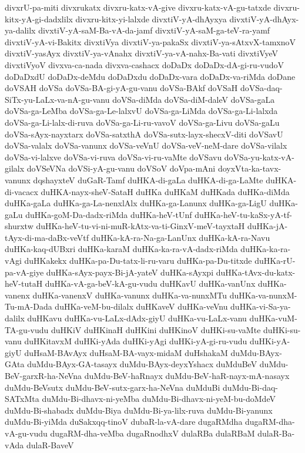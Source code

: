{divxrU-pa-miti
divxrukatx
divxru-katx-vA-give
divxru-katx-vA-gu-tatxde
divxru-kitx-yA-gi-dadxlilx
divxru-kitx-yi-lalxde
divxtiV-yA-dhAyxya
divxtiV-yA-dhAyx-ya-dalilx
divxtiV-yA-saM-Ba-vA-da-jamf
divxtiV-yA-saM-ga-teV-ra-yamf
divxtiV-yA-vi-Bakitx
divxtiVya
divxtiV-ya-pakaSx
divxtiV-ya-sAtxvX-tamxnoV
divxtiV-yasAyx
divxtiV-ya-vAnahx
divxtiV-ya-vA-nahx-Ba-vati
divxtiVyeV
divxtiVyoV
divxva-ca-nada
divxva-cashacx
doDaDx
doDaDx-dA-gi-ru-vudoV
doDaDxdU
doDaDx-deMdu
doDaDxdu
doDaDx-vara
doDaDx-va-riMda
doDane
doVSAH
doVSa
doVSa-BA-gi-yA-gu-vanu
doVSa-BAkf
doVSaH
doVSa-daq-SiTx-yu-LaLx-va-nA-gu-vanu
doVSa-diMda
doVSa-diM-daleV
doVSa-gaLa
doVSa-ga-LeMba
doVSa-ga-Le-lalxvU
doVSa-ga-LiMda
doVSa-ga-Li-lalxda
doVSa-ga-Li-lalx-di-ruva
doVSa-ga-Li-ru-vavoV
doVSa-ga-Livu
doVSa-gaLu
doVSa-sAyx-nayxtarx
doVSa-satxthA
doVSa-sutx-layx-shecxV-diti
doVSavU
doVSa-valalx
doVSa-vanunx
doVSa-veVnU
doVSa-veV-neM-dare
doVSa-vilalx
doVSa-vi-lalxve
doVSa-vi-ruva
doVSa-vi-ru-vaMte
doVSavu
doVSa-yu-katx-vA-gilalx
doVSeVNa
doVSi-yA-gu-vanu
doVSoV
doVpa-mAni
doyxVta-ka-tavx-vanunx
dqshayxteV
duGaR-Tamf
duHKA-di-gaLa
duHKA-di-ga-LaMte
duHKA-di-vacacx
duHKA-nayx-sheV-SataH
duHKa
duHKaM
duHKada
duHKa-diMda
duHKa-gaLa
duHKa-ga-La-nenxlAlx
duHKa-ga-Lanunx
duHKa-ga-LigU
duHKa-gaLu
duHKa-goM-Da-dadx-riMda
duHKa-heV-tUnf
duHKa-heV-tu-kaSx-yA-tf-shurxtw
duHKa-heV-tu-vi-ni-muR-kAtx-va-ti-GinxV-meV-tayxtaH
duHKa-jA-tAyx-di-ma-daBx-veVtf
duHKa-kA-ra-Na-ga-LanUnx
duHKa-kA-ra-Navu
duHKa-kaq-dUBxri
duHKa-karaM
duHKa-ka-ra-vA-dadx-riMda
duHKa-ka-ra-vAgi
duHKakekx
duHKa-pa-Du-tatx-li-ru-varu
duHKa-pa-Du-titxde
duHKa-rU-pa-vA-giye
duHKa-sAyx-payx-Bi-jA-yateV
duHKa-sAyxpi
duHKa-tAvx-du-katx-heV-tutaH
duHKa-vA-ga-beV-kA-gu-vudu
duHKavU
duHKa-vanUnx
duHKa-vanenx
duHKa-vanenxV
duHKa-vanunx
duHKa-va-nunxMTu
duHKa-va-nunxM-Tu-mA-Dada
duHKa-veM-bu-dilalx
duHKaveV
duHKa-veVnu
duHKa-vi-Sa-ya-dalilx
duHKavu
duHKa-vu-LaLx-dAdx-giyU
duHKa-vu-LaLx-vanu
duHKa-vuM-TA-gu-vudu
duHKiV
duHKinaH
duHKini
duHKinoV
duHKi-su-vaMte
duHKi-su-vanu
duHKitavxM
duHKi-yAda
duHKi-yAgi
duHKi-yA-gi-ru-vudu
duHKi-yA-giyU
duHsaM-BAvAyx
duHsaM-BA-vayx-midaM
duHshakaM
duMdu-BAyx-GAta
duMdu-BAyx-GA-tasayx
duMdu-BAyx-deyxYshacx
duMduBeV
duMdu-BeV-garxR-ha-NeVna
duMdu-BeV-haRnayx
duMdu-BeV-haR-nayx-mA-nasayx
duMdu-BeVsutx
duMdu-BeV-sutx-garx-ha-NeVna
duMduBi
duMdu-Bi-daq-SATxMta
duMdu-Bi-dhavx-ni-yeMba
duMdu-Bi-dhavx-ni-yeM-bu-doMdeV
duMdu-Bi-shabadx
duMdu-Biya
duMdu-Bi-ya-lilx-ruva
duMdu-Bi-yanunx
duMdu-Bi-yiMda
duSakxqq-tinoV
dubaR-la-vA-dare
dugaRMdha
dugaRM-dha-vA-gu-vudu
dugaRM-dha-veMba
dugaRnodhxV
dulaRBa
dulaRBaM
dulaR-Ba-vAda
dulaR-BaveV
}
